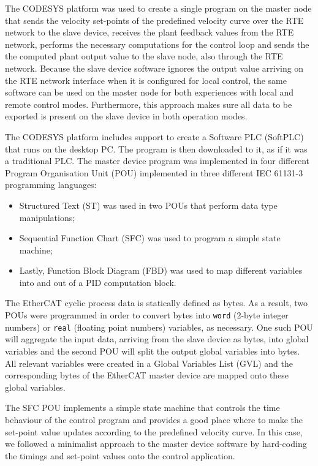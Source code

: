 The CODESYS platform was used to create a single program on the master node that sends the velocity set-points of the predefined velocity curve over the RTE network to the slave device, receives the plant feedback values from the RTE network, performs the necessary computations for the control loop and sends the the computed plant output value to the slave node, also through the RTE network.
Because the slave device software ignores the output value arriving on the RTE network interface when it is configured for local control, the same software can be used on the master node for both experiences with local and remote control modes.
Furthermore, this approach makes sure all data to be exported is present on the slave device in both operation modes.

The CODESYS platform includes support to create a Software PLC (SoftPLC) that runs on the desktop PC.
The program is then downloaded to it, as if it was a traditional PLC.
The master device program was implemented in four different Program Organisation Unit (POU) implemented in three different IEC 61131-3 programming languages: 
\begin{itemize}
	\item Structured Text (ST) was used in two POUs that perform data type manipulations;
	\item Sequential Function Chart (SFC) was used to program a simple state machine;
	\item Lastly, Function Block Diagram (FBD) was used to map different variables into and out of a PID computation block.
\end{itemize}

The EtherCAT cyclic process data is statically defined as bytes.
As a result, two POUs were programmed in order to convert bytes into \verb|word| (2-byte integer numbers) or \verb|real| (floating point numbers) variables, as necessary.
One such POU will aggregate the input data, arriving from the slave device as bytes, into global variables and the second POU will split the output global variables into bytes.
All relevant variables were created in a Global Variables List (GVL) and the corresponding bytes of the EtherCAT master device are mapped onto these global variables.

The SFC POU implements a simple state machine that controls the time behaviour of the control program and provides a good place where to make the set-point value updates according to the predefined velocity curve.
In this case, we followed a minimalist approach to the master device software by hard-coding the timings and set-point values onto the control application.

